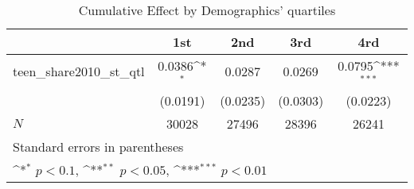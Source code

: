 \begin{table}[htbp]\centering
\def\sym#1{\ifmmode^{#1}\else\(^{#1}\)\fi}
\caption{Cumulative Effect by Demographics' quartiles}
\begin{tabular}{l*{4}{c}}
\hline\hline
            &\multicolumn{1}{c}{1st}&\multicolumn{1}{c}{2nd}&\multicolumn{1}{c}{3rd}&\multicolumn{1}{c}{4rd}\\
\hline
teen\_share2010\_st\_qtl&      0.0386\sym{*}  &      0.0287         &      0.0269         &      0.0795\sym{***}\\
            &    (0.0191)         &    (0.0235)         &    (0.0303)         &    (0.0223)         \\
\hline
\(N\)       &       30028         &       27496         &       28396         &       26241         \\
\hline\hline
\multicolumn{5}{l}{\footnotesize Standard errors in parentheses}\\
\multicolumn{5}{l}{\footnotesize \sym{*} \(p<0.1\), \sym{**} \(p<0.05\), \sym{***} \(p<0.01\)}\\
\end{tabular}
\end{table}
